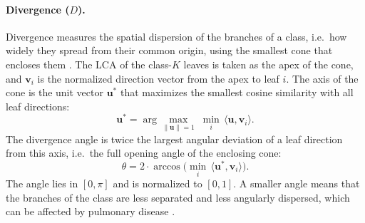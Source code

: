 \paragraph{Divergence ($D$).}            %
Divergence measures the spatial dispersion of the branches of a class, i.e.\ how widely
they spread from their common origin, using the smallest cone that encloses
them \cite{zhang2025airmorph}. The LCA of the class-$K$ leaves is taken as the apex of the
cone, and $\mathbf{v}_i$ is the normalized direction vector from the apex to leaf $i$. The
axis of the cone is the unit vector $\mathbf{u}^*$ that maximizes the smallest cosine
similarity with all leaf directions:
\begin{equation}
  \mathbf{u}^* = \arg\max_{\|\mathbf{u}\|=1} \; \min_i \,\langle \mathbf{u},
  \mathbf{v}_i \rangle.
  \label{eq:morph_div_axis}              %
\end{equation}
The divergence angle is twice the largest angular deviation of a leaf direction from this
axis, i.e.\ the full opening angle of the enclosing cone:
\begin{equation}
  \theta = 2 \cdot \arccos\Big(\min_i \,\langle \mathbf{u}^*, \mathbf{v}_i \rangle\Big).
  \label{eq:morph_div_theta}             %
\end{equation}
The angle lies in $[0, \pi]$ and is normalized to $[0, 1]$. A smaller angle means that the
branches of the class are less separated and less angularly dispersed, which can be affected
by pulmonary disease \cite{zhang2025airmorph}.

